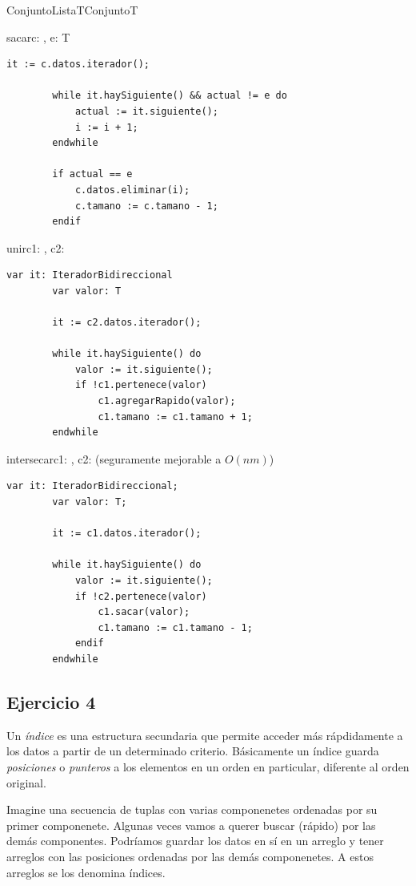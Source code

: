 \begin{module}{ConjuntoLista}{T}{Conjunto}{T}
\begin{proc}{sacar}{\Inout c: \moduletype, \In e: T}{}
\begin{lstlisting}[numbers=none,frame=none]
		it := c.datos.iterador();
		
		while it.haySiguiente() && actual != e do
			actual := it.siguiente();
			i := i + 1;
		endwhile

		if actual == e
			c.datos.eliminar(i);
			c.tamano := c.tamano - 1;
		endif
		\end{lstlisting}
	\end{proc}

	\begin{proc}{unir}{\Inout c1: \moduletype, \In c2: \moduletype}{}
		\begin{lstlisting}[numbers=none,frame=none]
		var it: IteradorBidireccional
		var valor: T

		it := c2.datos.iterador();

		while it.haySiguiente() do
			valor := it.siguiente();
			if !c1.pertenece(valor)
				c1.agregarRapido(valor);
				c1.tamano := c1.tamano + 1;
		endwhile
		\end{lstlisting}
	\end{proc}

	\begin{proc}{intersecar}{\Inout c1: \moduletype, \In c2: \moduletype}{}
		 (seguramente mejorable a $O(nm)$)
		\begin{lstlisting}[numbers=none,frame=none]
		var it: IteradorBidireccional;
		var valor: T;

		it := c1.datos.iterador();

		while it.haySiguiente() do
			valor := it.siguiente();
			if !c2.pertenece(valor)
				c1.sacar(valor);
				c1.tamano := c1.tamano - 1;
			endif
		endwhile
		\end{lstlisting}
	\end{proc}

\end{module}

\subsection{Ejercicio 4}
Un \textit{índice} es una estructura secundaria que permite acceder más rápdidamente a los datos a partir de un determinado criterio. Básicamente un índice guarda \textit{posiciones} o \textit{punteros} a los elementos en un orden en particular, diferente al orden original.

Imagine una secuencia de tuplas con varias componenetes ordenadas por su primer componenete. Algunas veces vamos a querer buscar (rápido) por las demás componentes. Podríamos guardar los datos en sí en un arreglo y tener arreglos con las posiciones ordenadas por las demás componenetes. A estos arreglos se los denomina índices.

